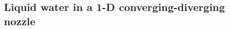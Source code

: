 \documentclass[review,10pt]{elsarticle}
\newcommand{\tcr}[1]{\textcolor{red}{#1}}
\begin{document}

\subsection{Liquid water in a 1-D converging-diverging nozzle} \label{sec:liquid_nozzle}
\end{document}
